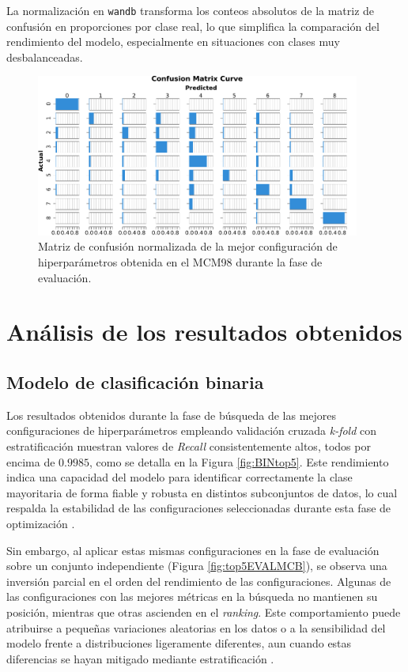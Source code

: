 La normalización en \texttt{wandb} transforma los conteos absolutos de la matriz de confusión en proporciones por clase real, lo que simplifica la comparación del rendimiento del modelo, especialmente en situaciones con clases muy desbalanceadas.

\begin{figure}[H]
    \centering
    \includegraphics[width=0.95\textwidth]{./img/evaluacion/matrices_confusion/MCNorm_EVAL_MCM98.pdf}
    \caption{Matriz de confusión normalizada de la mejor configuración de hiperparámetros obtenida en el MCM98 durante la fase de evaluación.}
    \label{fig:MCNorm_EVAL_MCM98}
\end{figure}




\section{Análisis de los resultados obtenidos} \label{sec:analEVAL}
\subsection{Modelo de clasificación binaria}

Los resultados obtenidos durante la fase de búsqueda de las mejores configuraciones de hiperparámetros empleando validación cruzada \textit{k-fold} con estratificación muestran valores de \textit{Recall} consistentemente altos, todos por encima de $0{.}9985$, como se detalla en la Figura \ref{fig:BINtop5}. Este rendimiento indica una capacidad del modelo para identificar correctamente la clase mayoritaria de forma fiable y robusta en distintos subconjuntos de datos, lo cual respalda la estabilidad de las configuraciones seleccionadas durante esta fase de optimización \cite{bergstra2012random}.

Sin embargo, al aplicar estas mismas configuraciones en la fase de evaluación sobre un conjunto independiente (Figura \ref{fig:top5EVALMCB}), se observa una inversión parcial en el orden del rendimiento de las configuraciones. Algunas de las configuraciones con las mejores métricas en la búsqueda no mantienen su posición, mientras que otras ascienden en el \textit{ranking}. Este comportamiento puede atribuirse a pequeñas variaciones aleatorias en los datos o a la sensibilidad del modelo frente a distribuciones ligeramente diferentes, aun cuando estas diferencias se hayan mitigado mediante estratificación \cite{reimers2017optimal}.


